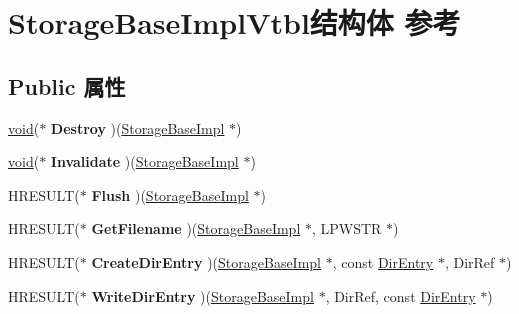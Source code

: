 \hypertarget{struct_storage_base_impl_vtbl}{}\section{Storage\+Base\+Impl\+Vtbl结构体 参考}
\label{struct_storage_base_impl_vtbl}
\subsection*{Public 属性}
\begin{DoxyCompactItemize}
\item 
\mbox{\label{struct_storage_base_impl_vtbl_aecc7e61a1e8926b863d2bb04b759eaad}} 
\hyperlink{interfacevoid}{void}($\ast$ {\bfseries Destroy} )(\hyperlink{struct_storage_base_impl}{Storage\+Base\+Impl} $\ast$)
\item 
\mbox{\label{struct_storage_base_impl_vtbl_aabb1a4774246f6af28de56f9951f9949}} 
\hyperlink{interfacevoid}{void}($\ast$ {\bfseries Invalidate} )(\hyperlink{struct_storage_base_impl}{Storage\+Base\+Impl} $\ast$)
\item 
\mbox{\label{struct_storage_base_impl_vtbl_a1082f0c949a599efd39b3e42eccb513a}} 
H\+R\+E\+S\+U\+LT($\ast$ {\bfseries Flush} )(\hyperlink{struct_storage_base_impl}{Storage\+Base\+Impl} $\ast$)
\item 
\mbox{\label{struct_storage_base_impl_vtbl_af8ab8de94a6941d9d7a32cd68e51e7a8}} 
H\+R\+E\+S\+U\+LT($\ast$ {\bfseries Get\+Filename} )(\hyperlink{struct_storage_base_impl}{Storage\+Base\+Impl} $\ast$, L\+P\+W\+S\+TR $\ast$)
\item 
\mbox{\label{struct_storage_base_impl_vtbl_aa303c274411f976578a7cd8198c242b6}} 
H\+R\+E\+S\+U\+LT($\ast$ {\bfseries Create\+Dir\+Entry} )(\hyperlink{struct_storage_base_impl}{Storage\+Base\+Impl} $\ast$, const \hyperlink{struct_dir_entry}{Dir\+Entry} $\ast$, Dir\+Ref $\ast$)
\item 
\mbox{\label{struct_storage_base_impl_vtbl_a476c17f29ce1c72a743b511c2c5b722b}} 
H\+R\+E\+S\+U\+LT($\ast$ {\bfseries Write\+Dir\+Entry} )(\hyperlink{struct_storage_base_impl}{Storage\+Base\+Impl} $\ast$, Dir\+Ref, const \hyperlink{struct_dir_entry}{Dir\+Entry} $\ast$)

\end{DoxyCompactItemize}
